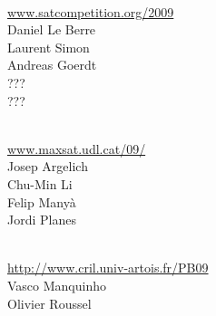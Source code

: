 \documentclass[10pt]{article}
\newcommand{\bthlight}[1]{{\color[rgb]{0.2,0.2,0.5}#1}}
\begin{document}
\begin{minipage}[t]{9.25cm}
  \begin{minipage}[t]{9.25cm}
    \vspace*{0.35cm}
    \begin{minipage}[t]{4.5cm}
      \bthlight{{\bf SAT Competition}} \\
               {\small \url{www.satcompetition.org/2009}}\\[0.15cm]
               Daniel Le Berre\\
               Laurent Simon\\[0.15cm]
               Andreas Goerdt\\
               ??? \\
               ??? %
    \end{minipage}
    \hspace*{0.5cm}
    \begin{minipage}[t]{4.25cm}
      \bthlight{{\bf MAX-SAT Evaluation}}\\
               {\small \url{www.maxsat.udl.cat/09/}}\\[0.15cm]
               Josep Argelich\\
               Chu-Min Li\\
               Felip Many\`{a}\\
               Jordi Planes %
    \end{minipage}

    \begin{minipage}[t]{9.25cm}
      \vspace*{0.25cm}
      \begin{minipage}[t]{6.0cm}
        \bthlight{{\bf PB Evaluation}}\\
                 {\small \url{http://www.cril.univ-artois.fr/PB09}}\\[0.15cm]
                 Vasco Manquinho\\
                 Olivier Roussel %
      \end{minipage}
    \end{minipage}
  \end{minipage}


\end{minipage}
%
\end{document}
